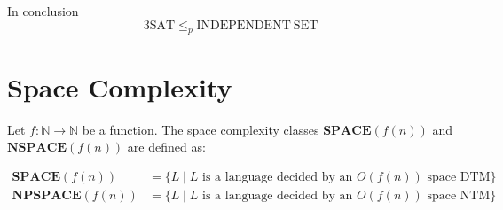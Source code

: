 \documentclass[12pt,a4paper,openany]{article}
\begin{document}
In conclusion \[\mathrm{3SAT} \leq_p \mathrm{INDEPENDENT\ SET}\]

\section{Space Complexity}

Let $f: \mathbb{N} \to \mathbb{N}$ be a function. The space complexity classes
$\mathbf{SPACE}(f(n))$ and $\mathbf{NSPACE}(f(n))$ are defined as:

\begin{align*}
\mathbf{SPACE}(f(n)) &= \{ L \mid L \text{ is a language decided by an } O(f(n)) \text{ space DTM} \} \\[1em]
\mathbf{NPSPACE}(f(n)) &= \{ L \mid L \text{ is a language decided by an } O(f(n)) \text{ space NTM} \}
\end{align*}
\end{document}
